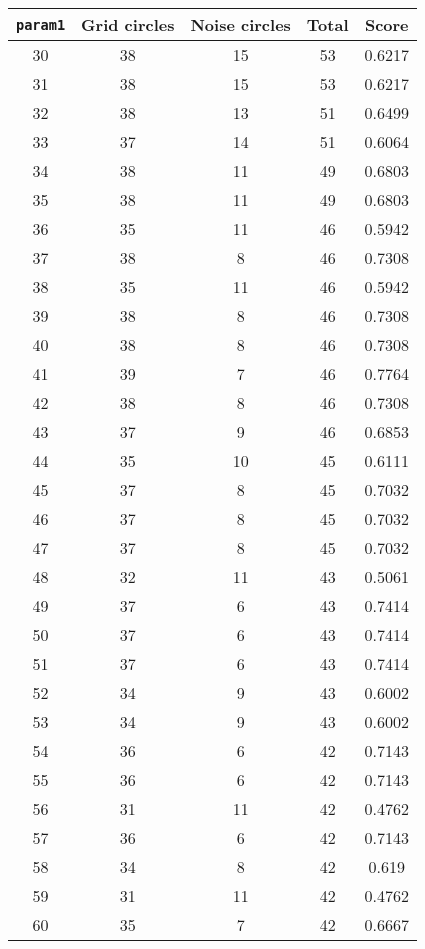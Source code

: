 \documentclass[letterpaper, 12pt]{article}
\begin{document}
\begin{longtable}{|c|c|c|c|c|}
\hline
\textbf{\texttt{param1}} & \textbf{Grid circles} & \textbf{Noise circles} & \textbf{Total} & \textbf{Score} \\
\hline
30 & 38 & 15 & 53 & 0.6217 \\
\hline
31 & 38 & 15 & 53 & 0.6217 \\
\hline
32 & 38 & 13 & 51 & 0.6499 \\
\hline
33 & 37 & 14 & 51 & 0.6064 \\
\hline
34 & 38 & 11 & 49 & 0.6803 \\
\hline
35 & 38 & 11 & 49 & 0.6803 \\
\hline
36 & 35 & 11 & 46 & 0.5942 \\
\hline
37 & 38 & 8 & 46 & 0.7308 \\
\hline
38 & 35 & 11 & 46 & 0.5942 \\
\hline
39 & 38 & 8 & 46 & 0.7308 \\
\hline
40 & 38 & 8 & 46 & 0.7308 \\
\hline
41 & 39 & 7 & 46 & 0.7764 \\
\hline
42 & 38 & 8 & 46 & 0.7308 \\
\hline
43 & 37 & 9 & 46 & 0.6853 \\
\hline
44 & 35 & 10 & 45 & 0.6111 \\
\hline
45 & 37 & 8 & 45 & 0.7032 \\
\hline
46 & 37 & 8 & 45 & 0.7032 \\
\hline
47 & 37 & 8 & 45 & 0.7032 \\
\hline
48 & 32 & 11 & 43 & 0.5061 \\
\hline
49 & 37 & 6 & 43 & 0.7414 \\
\hline
50 & 37 & 6 & 43 & 0.7414 \\
\hline
51 & 37 & 6 & 43 & 0.7414 \\
\hline
52 & 34 & 9 & 43 & 0.6002 \\
\hline
53 & 34 & 9 & 43 & 0.6002 \\
\hline
54 & 36 & 6 & 42 & 0.7143 \\
\hline
55 & 36 & 6 & 42 & 0.7143 \\
\hline
56 & 31 & 11 & 42 & 0.4762 \\
\hline
57 & 36 & 6 & 42 & 0.7143 \\
\hline
58 & 34 & 8 & 42 & 0.619 \\
\hline
59 & 31 & 11 & 42 & 0.4762 \\
\hline
60 & 35 & 7 & 42 & 0.6667 \\
\hline

\end{longtable}
\end{document}

